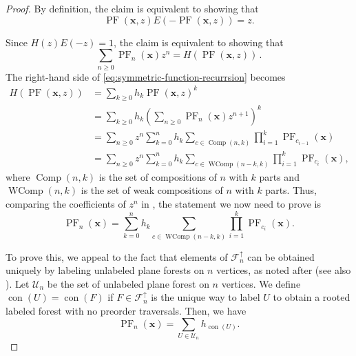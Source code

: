 \documentclass{amsart}
\newcommand{\eqpd}{\, .}
\DeclareMathOperator{\PF}{PF}
\DeclareMathOperator{\Comp}{Comp}
\DeclareMathOperator{\WComp}{WComp}
\DeclareMathOperator{\con}{con}
\newcommand{\lp}{\left(}
\newcommand{\rp}{\right)}
\theoremstyle{definition}
\begin{document}
\begin{proof}
By definition, the claim is equivalent to showing that 
\[\PF(\mathbf{x},z)E(-\PF(\mathbf{x},z))=z.\]

    Since $H(z)E(-z)=1$, the claim is equivalent to showing that 
    \begin{equation}\label{eq:symmetric-function-recurrsion}\sum_{n\geq 0}\PF_n(\mathbf{x})z^{n}=H(\PF(\mathbf{x},z)) \eqpd
    \end{equation}
    The right-hand side of \eqref{eq:symmetric-function-recurrsion} becomes
    \begin{align*}
        H(\PF(\mathbf{x},z))&=\sum_{k\geq 0} h_k \PF(\mathbf{x},z)^k\\    &=\sum_{k\geq 0} h_k\lp \sum_{n\geq 0}\PF_n(\mathbf{x})z^{n+1}\rp^k\\
        &=\sum_{n\geq 0}z^n \sum_{k=0}^n h_k \sum_{c\in \Comp(n,k)}\prod_{i=1}^k \PF_{c_{i-1}}(\mathbf{x})\\
        &=\sum_{n\geq 0}z^n \sum_{k=0}^n h_k \sum_{c\in \WComp(n-k,k)}\prod_{i=1}^k \PF_{c_{i}}(\mathbf{x}),
    \end{align*}
    where $\Comp(n,k)$ is the set of compositions of $n$ with $k$ parts and $\WComp(n,k)$ is the set of weak compositions of $n$ with $k$ parts.  Thus, comparing the coefficients of $z^n$ in , the statement we now need to prove is 
    \begin{equation}\label{eq:tree-recurrsion}
        \PF_n(\mathbf{x})=\sum_{k=0}^n h_k \sum_{c\in \WComp(n-k,k)}\prod_{i=1}^k \PF_{c_{i}}(\mathbf{x}).
    \end{equation}

    To prove this, we appeal to the fact that elements of  $\mathcal{F}^{\uparrow}_n$ can be obtained uniquely by labeling unlabeled plane forests on $n$ vertices, as noted after  (see also ). Let $\mathcal{U}_n$ be the set of unlabeled plane forest on $n$ vertices. We define $\con(U)=\con(F)$ if $F\in \mathcal{F}^{\uparrow}_n$ is the unique way to label $U$ to obtain a rooted labeled forest with no preorder traversals. Then, we have
    \begin{equation}\label{eq:PF-to-UF}\PF_n(\mathbf{x})=\sum_{U\in \mathcal{U}_n} h_{\con(U)}.\end{equation}
    

\end{proof}
\end{document}
